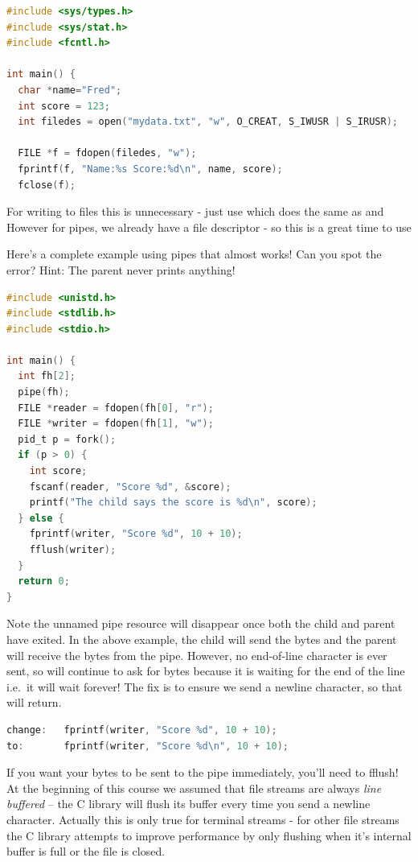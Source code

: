 \begin{lstlisting}[language=C]
#include <sys/types.h>
#include <sys/stat.h>
#include <fcntl.h>

int main() {
  char *name="Fred";
  int score = 123;
  int filedes = open("mydata.txt", "w", O_CREAT, S_IWUSR | S_IRUSR);

  FILE *f = fdopen(filedes, "w");
  fprintf(f, "Name:%s Score:%d\n", name, score);
  fclose(f);
\end{lstlisting}

For writing to files this is unnecessary - just use  which does the same as  and  However for pipes, we already have a file descriptor - so this is a great time to use 

Here's a complete example using pipes that almost works!
Can you spot the error?
Hint: The parent never prints anything!

\begin{lstlisting}[language=C]
#include <unistd.h>
#include <stdlib.h>
#include <stdio.h>

int main() {
  int fh[2];
  pipe(fh);
  FILE *reader = fdopen(fh[0], "r");
  FILE *writer = fdopen(fh[1], "w");
  pid_t p = fork();
  if (p > 0) {
    int score;
    fscanf(reader, "Score %d", &score);
    printf("The child says the score is %d\n", score);
  } else {
    fprintf(writer, "Score %d", 10 + 10);
    fflush(writer);
  }
  return 0;
}
\end{lstlisting}

Note the unnamed pipe resource will disappear once both the child and parent have exited.
In the above example, the child will send the bytes and the parent will receive the bytes from the pipe.
However, no end-of-line character is ever sent, so  will continue to ask for bytes because it is waiting for the end of the line i.e.~it will wait forever! The fix is to ensure we send a newline character, so that  will return.

\begin{lstlisting}[language=C]
change:   fprintf(writer, "Score %d", 10 + 10);
to:       fprintf(writer, "Score %d\n", 10 + 10);
\end{lstlisting}

If you want your bytes to be sent to the pipe immediately, you'll need to fflush!
At the beginning of this course we assumed that file streams are always \emph{line buffered} -- the C library will flush its buffer every time you send a newline character.
Actually this is only true for terminal streams - for other file streams the C library attempts to improve performance by only flushing when it's internal buffer is full or the file is closed.


